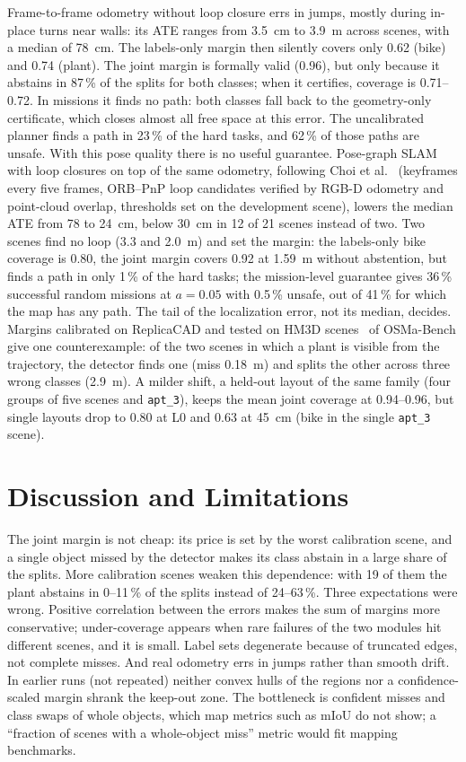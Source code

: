 \documentclass[conference]{IEEEtran}
\theoremstyle{definition}
\begin{document}
Frame-to-frame odometry without loop closure errs in jumps, mostly during in-place turns near walls: its ATE ranges from
3.5~cm to 3.9~m across scenes, with a median of 78~cm. The labels-only margin then silently covers only 0.62 (bike) and
0.74 (plant). The joint margin is formally valid (0.96), but only because it abstains in 87\,\% of the splits for both
classes; when it certifies, coverage is 0.71--0.72. In missions it finds no path: both classes fall back to the
geometry-only certificate, which closes almost all free space at this error. The uncalibrated planner finds a path in
23\,\% of the hard tasks, and 62\,\% of those paths are unsafe. With this pose quality there is no useful guarantee.
Pose-graph SLAM with loop closures on top of the same odometry, following Choi et al.~\cite{choi2015} (keyframes every
five frames, ORB--PnP loop candidates verified by RGB-D odometry and point-cloud overlap, thresholds set on the
development scene), lowers the median ATE from 78 to 24~cm, below 30~cm in 12 of 21 scenes instead of two. Two scenes
find no loop (3.3 and 2.0~m) and set the margin: the labels-only bike coverage is 0.80, the joint margin covers 0.92
at 1.59~m without abstention, but finds a path in only 1\,\% of the hard tasks; the mission-level guarantee gives
36\,\% successful random missions at $a = 0.05$ with 0.5\,\% unsafe, out of 41\,\% for which the map has any path.
The tail of the localization error, not its median, decides.
Margins calibrated on ReplicaCAD and tested on HM3D scenes~\cite{hm3d} of OSMa-Bench give one counterexample: of the
two scenes in which a plant is visible from the trajectory, the detector finds one (miss 0.18~m) and splits the other
across three wrong classes (2.9~m). A milder shift, a held-out layout of the same family (four groups of five scenes and
\texttt{apt\_3}), keeps the mean joint coverage at 0.94--0.96, but single layouts drop to 0.80 at L0 and 0.63
at 45~cm (bike in the single \texttt{apt\_3} scene).

\section{Discussion and Limitations}

The joint margin is not cheap: its price is set by the worst calibration scene, and a single object missed by the
detector makes its class abstain in a large share of the splits. More calibration scenes weaken this dependence:
with 19 of them the plant abstains in 0--11\,\% of the splits instead of 24--63\,\%. Three expectations were wrong. Positive correlation between the errors makes the sum of margins more conservative;
under-coverage appears when rare failures of the two modules hit different scenes, and it is small. Label sets
degenerate because of truncated edges, not complete misses. And real odometry errs in jumps rather than smooth drift.
In earlier runs (not repeated) neither convex hulls of the regions nor a confidence-scaled margin shrank the
keep-out zone. The bottleneck is confident misses and class swaps of whole objects, which map metrics such as mIoU do not show; a
``fraction of scenes with a whole-object miss'' metric would fit mapping benchmarks.
\end{document}
